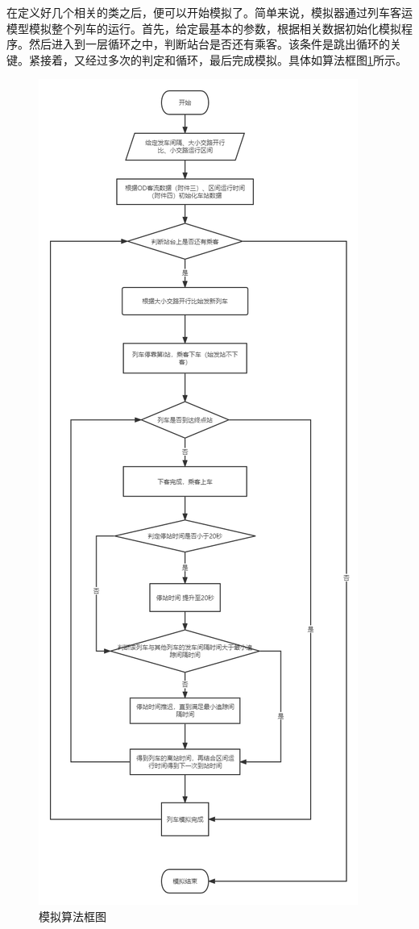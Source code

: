 在定义好几个相关的类之后，便可以开始模拟了。简单来说，模拟器通过列车客运模型模拟整个列车的运行。首先，给定最基本的参数，根据相关数据初始化模拟程序。然后进入到一层循环之中，判断站台是否还有乘客。该条件是跳出循环的关键。紧接着，又经过多次的判定和循环，最后完成模拟。具体如算法框图\ref{figure170144}所示。

\begin{figure}
    \centering
    \includegraphics[scale=0.38]{res/figure170144.png}
    \caption{模拟算法框图}
    \label{figure170144}
\end{figure}

